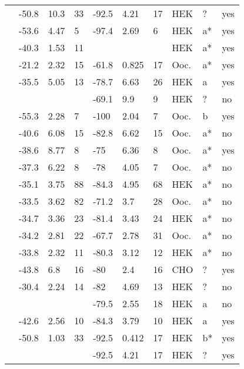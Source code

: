 \begin{longtable}{p{5cm}|lll|lll|lll}
\citet{Crotti2012aMutationDB} & -50.8 & 10.3 & 33 & -92.5 & 4.21 & 17 & HEK & ? & yes \\
\citet{Deschenes2000MutationDB} & -53.6 & 4.47 & 5 & -97.4 & 2.69 & 6 & HEK & a* & yes \\
\citet{Detta2014MutationDB} & -40.3 & 1.53 & 11 & && & HEK & a* & yes \\
\citet{Ellinor2008MutationDB} & -21.2 & 2.32 & 15 & -61.8 & 0.825 & 17 & Ooc. & a* & yes \\
\citet{Ge2008MutationDB} & -35.5 & 5.05 & 13 & -78.7 & 6.63 & 26 & HEK & a & yes \\
\citet{Glaaser2012MutationDB} & && & -69.1 & 9.9 & 9 & HEK & ? & no \\
\citet{GosselinBadaroudine2012MutationDB} & -55.3 & 2.28 & 7 & -100 & 2.04 & 7 & Ooc. & b & yes \\
\citet{Groenewegen2003aMutationDB} & -40.6 & 6.08 & 15 & -82.8 & 6.62 & 15 & Ooc. & a* & no \\
\citet{Groenewegen2003aMutationDB} & -38.6 & 8.77 & 8 & -75 & 6.36 & 8 & Ooc. & a* & yes \\
\citet{Groenewegen2003bMutationDB} & -37.3 & 6.22 & 8 & -78 & 4.05 & 7 & Ooc. & a* & no \\
\citet{Guetter2013MutationDB} & -35.1 & 3.75 & 88 & -84.3 & 4.95 & 68 & HEK & a* & no \\
\citet{Guetter2013MutationDB} & -33.5 & 3.62 & 82 & -71.2 & 3.7 & 28 & Ooc. & a* & no \\
\citet{Gui2010aMutationDB} & -34.7 & 3.36 & 23 & -81.4 & 3.43 & 24 & HEK & a* & no \\
\citet{Gui2010aMutationDB} & -34.2 & 2.81 & 22 & -67.7 & 2.78 & 31 & Ooc. & a* & no \\
\citet{Gui2010bMutationDB} & -33.8 & 2.32 & 11 & -80.3 & 3.12 & 12 & HEK & a* & no \\
\citet{Hayashi2015MutationDB} & -43.8 & 6.8 & 16 & -80 & 2.4 & 16 & CHO & ? & yes \\
\citet{Holst2009MutationDB} & -30.4 & 2.24 & 14 & -82 & 4.69 & 13 & HEK & ? & no \\
\citet{Hoshi2014MutationDB} & && & -79.5 & 2.55 & 18 & HEK & a & no \\
\citet{Hsueh2009MutationDB} & -42.6 & 2.56 & 10 & -84.3 & 3.79 & 10 & HEK & a & yes \\
\citet{Hu2007MutationDB} & -50.8 & 1.03 & 33 & -92.5 & 0.412 & 17 & HEK & b* & yes \\
\citet{Hu2010MutationDB} & && & -92.5 & 4.21 & 17 & HEK & ? & yes \\

\end{longtable}
